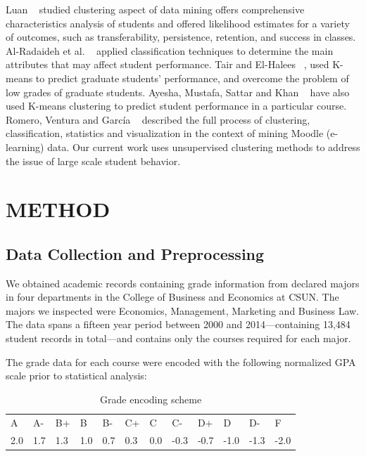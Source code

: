 \documentclass{sigchi}
\begin{document}
Luan ~\cite{luan2002data} studied clustering aspect of data mining offers comprehensive characteristics analysis of students and offered likelihood estimates for a variety of outcomes, such as transferability, persistence, retention, and success in classes.  Al-Radaideh et al. ~\cite{al2006mining} applied classification techniques to determine the main attributes that may affect student performance. Tair and El-Halees ~\cite{tair2012mining}, used K-means to predict graduate students’ performance, and overcome the problem of low grades of graduate students.  Ayesha, Mustafa, Sattar and Khan ~\cite{ayesha2010data} have also used K-means clustering to predict student performance in a particular course. Romero, Ventura and García ~\cite{romero2008data} described the full process of clustering, classification, statistics and visualization in the context of mining Moodle (e-learning) data. Our current work uses unsupervised clustering methods to address the issue of large scale student behavior.









\section{METHOD}

\subsection{Data Collection and Preprocessing}

We obtained academic records containing grade information from declared majors in four departments in the College of Business and Economics at CSUN. The majors we inspected were Economics, Management, Marketing and Business Law. The data spans a fifteen year period between 2000 and 2014—containing 13,484 student records in total—and contains only the courses required for each major. 

The grade data for each course were encoded with the following normalized GPA scale prior to statistical analysis: 

\begin{table}[h]
\begin{tabular}{llllllllllll}
A   & A-  & B+  & B   & B-  & C+  & C & C-   & D+   & D    & D-   & F \\
2.0 & 1.7 & 1.3 & 1.0 & 0.7 & 0.3 & 0.0 & -0.3 & -0.7 & -1.0 & -1.3 &  -2.0
\end{tabular}
\caption{Grade encoding scheme}~\label{tab:gradeEncodingTable}
\end{table}
\end{document}
